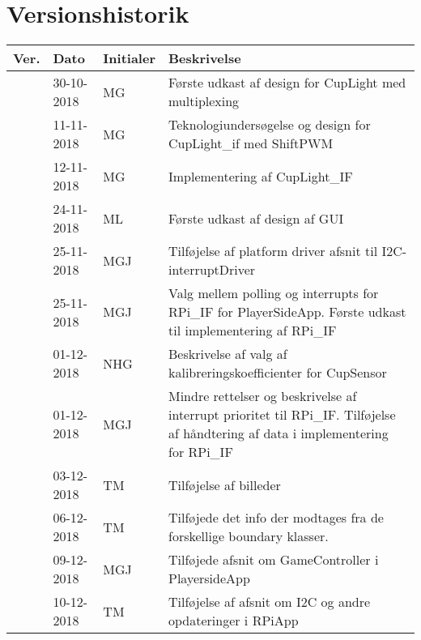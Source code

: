 \documentclass[Softwaredesign/Softwaredesign_main.tex]{subfiles}
\begin{document}
\section{Versionshistorik}
\begin{longtable}{|L{0.07\textwidth}|L{0.15\textwidth}|L{0.13\textwidth}|L{0.55\textwidth}|}
        \hline
        \textbf{Ver.} & \textbf{Dato} & \textbf{Initialer} & \textbf{Beskrivelse}  \\ \hline
         & 30-10-2018 & MG &  Første udkast af design for CupLight med multiplexing\\ \hline
         & 11-11-2018 & MG &  Teknologiundersøgelse og design for CupLight\_if med ShiftPWM\\ \hline
         & 12-11-2018 & MG &  Implementering af CupLight\_IF\\ \hline
         & 24-11-2018 & ML & Første udkast af design af GUI \\ \hline
         & 25-11-2018 & MGJ & Tilføjelse af platform driver afsnit til I2C-interruptDriver \\ \hline
         & 25-11-2018 & MGJ & Valg mellem polling og interrupts for RPi\_IF for PlayerSideApp. Første udkast til implementering  af RPi\_IF \\ \hline
         & 01-12-2018 & NHG & Beskrivelse af valg af kalibreringskoefficienter for CupSensor \\ \hline 
         & 01-12-2018 & MGJ & Mindre rettelser og beskrivelse af interrupt prioritet til RPi\_IF. Tilføjelse af håndtering af data i implementering for RPi\_IF \\ \hline
         & 03-12-2018 & TM & Tilføjelse af billeder \\ \hline
         & 06-12-2018 & TM & Tilføjede det info der modtages fra de forskellige boundary klasser. \\ \hline
         & 09-12-2018 & MGJ & Tilføjede afsnit om GameController i PlayersideApp \\ \hline
         & 10-12-2018 & TM & Tilføjelse af afsnit om I2C og andre opdateringer i RPiApp \\ \hline
\end{longtable}
\end{document}
